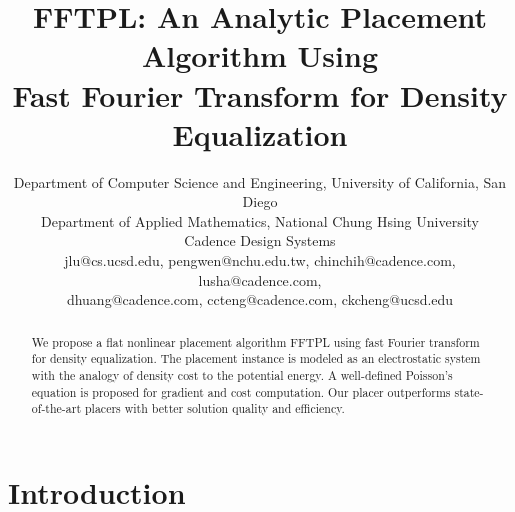 \documentclass[conference,10pt]{IEEEtran}
\newcounter{def}
\begin{document}
\title{\huge \bf FFTPL: An Analytic Placement Algorithm Using \\ Fast Fourier Transform for Density Equalization}





\author{
\IEEEauthorblockA
{Department of Computer Science and Engineering, University of California, San Diego \\
Department of Applied Mathematics, National Chung Hsing University \\
Cadence Design Systems \\
jlu@cs.ucsd.edu, pengwen@nchu.edu.tw, chinchih@cadence.com, lusha@cadence.com, \\
dhuang@cadence.com, ccteng@cadence.com, ckcheng@ucsd.edu\\}}
\maketitle
\thispagestyle{empty}
\renewcommand{\headrulewidth}{0pt}
\begin{abstract}
\label{sec:abs}
We propose a flat nonlinear placement algorithm FFTPL
using fast Fourier transform for density equalization.
The placement instance is modeled as an electrostatic system 
with the analogy of density cost to the potential energy.
A well-defined Poisson's equation is proposed for 
gradient and cost computation.
Our placer outperforms state-of-the-art placers 
with better solution quality and efficiency.
\end{abstract}



\section{Introduction}
\label{sec:intro}
\end{document}
